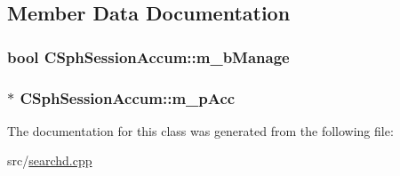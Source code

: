 \subsection{Member Data Documentation}
\hypertarget{classCSphSessionAccum_a2b561f1960b2b5610bf61cd65a0f682c}{
\subsubsection[{m\-\_\-b\-Manage}]{\setlength{\rightskip}{0pt plus 5cm}bool C\-Sph\-Session\-Accum\-::m\-\_\-b\-Manage\hspace{0.3cm}{\ttfamily [private]}}}\label{classCSphSessionAccum_a2b561f1960b2b5610bf61cd65a0f682c}
\hypertarget{classCSphSessionAccum_a7558518bb3604825c38a97a071ed1969}{
\subsubsection[{m\-\_\-p\-Acc}]{$\ast$ C\-Sph\-Session\-Accum\-::m\-\_\-p\-Acc\hspace{0.3cm}{\ttfamily [private]}}}\label{classCSphSessionAccum_a7558518bb3604825c38a97a071ed1969}


The documentation for this class was generated from the following file\-:\begin{DoxyCompactItemize}
\item 
src/\hyperlink{searchd_8cpp}{searchd.\-cpp}\end{DoxyCompactItemize}
